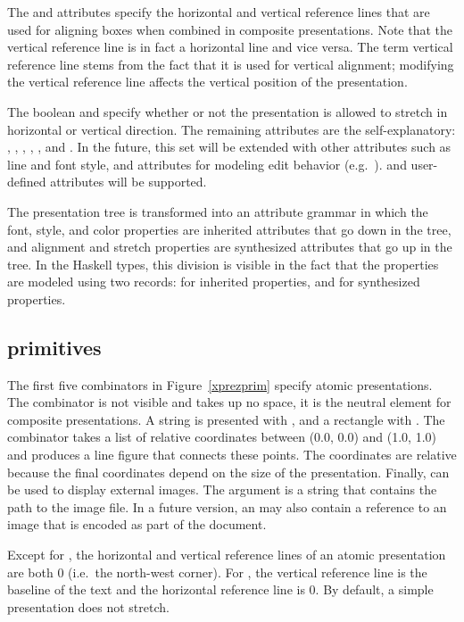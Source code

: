The  and  attributes specify the horizontal and vertical reference lines that are used for aligning boxes when combined in composite presentations. Note that the vertical reference line is in fact a horizontal line and vice versa. The term vertical reference line stems from the fact that it is used for vertical alignment; modifying the vertical reference line affects the vertical position of the presentation. 

The boolean  and  specify whether or not the presentation is allowed to stretch in horizontal or vertical direction. The remaining attributes are the self-explanatory: , , , , , and . In the future, this set will be extended with other attributes such as line and font style, and attributes for modeling edit behavior (e.g.\ ). \bc and user-defined attributes will be supported. \ec

\bc
The presentation tree is transformed into an attribute grammar in which the font, style, and color properties are inherited attributes that go down in the tree, and alignment and stretch properties are synthesized attributes that go up in the tree. In the Haskell types, this division is visible in the fact that the properties are modeled using two records:  for inherited properties, and  for synthesized properties.
\ec

%																
\subsection{{\Xprez} primitives} \label{sect:primitives}

The first five combinators in Figure~\ref{xprezprim} specify atomic presentations. The  combinator is not visible and takes up no space, it is the neutral element for composite presentations. A string is presented with , and a rectangle with . The  combinator takes a list of relative coordinates between (0.0, 0.0) and (1.0, 1.0) and produces a line figure that connects these points. The coordinates are relative because the final coordinates depend on the size of the  presentation. Finally,  can be used to display external images. The argument is a string that contains the path to the image file. In a future version, an  may also contain a reference to an image that is encoded as part of the document.

Except for , the horizontal and vertical reference lines of an atomic presentation are both 0 (i.e.\ the north-west corner). For ,  the vertical reference line is the baseline of the text and the horizontal reference line is 0. By default, a  simple presentation does not stretch.

